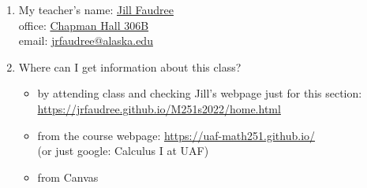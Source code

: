 \documentclass[11pt,fleqn]{article}
\begin{document}
\renewcommand{\headrulewidth}{0pt}
\newcommand{\blank}[1]{\rule{#1}{0.75pt}}
\renewcommand{\d}{\displaystyle}
\vspace*{-0.7in}
\begin{center}
  \large {}
\end{center}


\begin{enumerate}
\item My teacher's name: \underline{Jill Faudree }\\ office:  \underline{Chapman Hall 306B}\\ email:  \underline{jrfaudree@alaska.edu}\\

\item Where can I get information about this class?\\
\begin{itemize}
\item by attending class and checking Jill's webpage just for this section: \\
	\url{https://jrfaudree.github.io/M251s2022/home.html}
\item from the course webpage: \url{https://uaf-math251.github.io/} \\(or just google: Calculus I at UAF)
\item from Canvas
\end{itemize}


\end{enumerate}
\end{document}
